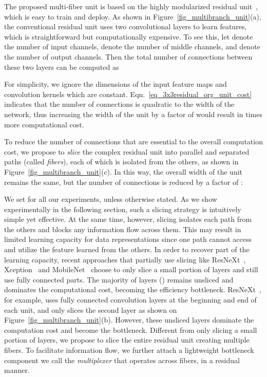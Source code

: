 \documentclass[runningheads]{llncs}
\newcommand{\ourslong}[0]{multi-fiber\xspace}
\newcommand{\switch}[0]{multiplexer\xspace}
\begin{document}
The proposed \ourslong unit is based on the highly modularized residual unit~\cite{he2016deep}, which is easy to train and deploy. As shown in Figure~\ref{fig_multibranch_unit}(a), the conventional residual unit uses two convolutional layers to learn features, which is straightforward but computationally expensive. 
To see this, let  denote the number of input channels,   denote the number of middle channels, and  denote the number of output channels. Then the total number of connections between these two layers can be computed as

For simplicity, we ignore the dimensions of the input feature maps and convolution kernels which are constant. Eqn.~\eqref{eq_3x3residual_org_unit_cost} indicates that the number of connections is quadratic to the width of the network, thus increasing  the width of the unit by a factor of  would result in  times more computational cost.

To reduce the number of connections that are essential to the overall computation cost, we propose to \emph{slice} the complex residual unit into  parallel and separated paths (called \emph{fibers}), each of which is isolated from the others, as shown in Figure~\ref{fig_multibranch_unit}(c). In this way, the overall width of the unit remains the same, but the number of connections is reduced by a factor of :

We set  for all our experiments, unless otherwise stated.
As we show experimentally in the following section, such a slicing strategy is intuitively simple yet effective. At the same time, however, slicing isolates each path from the others and blocks any information flow across them. This may result in limited learning capacity for data representations since one path cannot access and utilize the feature learned from the others. 
In order to recover part of the learning capacity, recent approaches that partially use slicing like ResNeXt~\cite{xie2017aggregated}, Xception~\cite{chollet2017xception} and MobileNet~\cite{howard2017mobilenets,sandler2018inverted} choose to only slice a small portion of layers and still use fully connected parts. The majority of layers () remains unsliced and dominates the computational cost, becoming the efficiency bottleneck. 
ResNeXt~\cite{xie2017aggregated}, for example, uses fully connected convolution layers at the beginning and end of each unit, and only slices the second layer as shown on Figure~\ref{fig_multibranch_unit}(b). However, these unsliced layers dominate the computation cost and become the bottleneck.
Different from only slicing a small portion of layers, we propose to slice the entire residual unit creating multiple fibers. To facilitate information flow, we further attach a lightweight bottleneck component we call the \emph{\switch} that operates across fibers, in a residual manner. 
\end{document}
